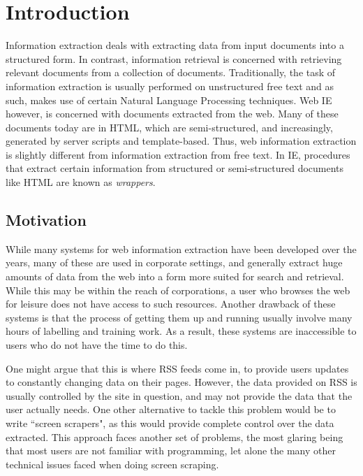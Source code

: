 \chapter{Introduction}
Information extraction deals with extracting data from input documents into a structured form.
In contrast, information retrieval is concerned with retrieving relevant documents from a
collection of documents. Traditionally, the task of information extraction is usually performed
on unstructured free text and as such, makes use of certain Natural Language Processing
techniques. Web IE however, is concerned with documents extracted from the web. Many of these
documents today are in HTML, which are semi-structured, and increasingly, generated by server
scripts and template-based. Thus, web information extraction is slightly different from
information extraction from free text. In IE, procedures that extract certain information from
structured or semi-structured documents like HTML are known as \textit{wrappers}.


\section{Motivation}
While many systems for web information extraction have been developed over the years, many of
these are used in corporate settings, and generally extract huge amounts of data from the web
into a form more suited for search and retrieval. While this may be within the reach of
corporations, a user who browses the web for leisure does not have access to such resources.
Another drawback of these systems is that the process of getting them up and running usually
involve many hours of labelling and training work. As a result, these systems are inaccessible
to users who do not have the time to do this.

One might argue that this is where RSS feeds come in, to provide users updates to constantly
changing data on their pages. However, the data provided on RSS is usually controlled by the
site in question, and may not provide the data that the user actually needs. One other
alternative to tackle this problem would be to write ``screen scrapers", as this would provide
complete control over the data extracted. This approach faces another set of problems, the most
glaring being that most users are not familiar with programming, let alone the many other
technical issues faced when doing screen scraping.


